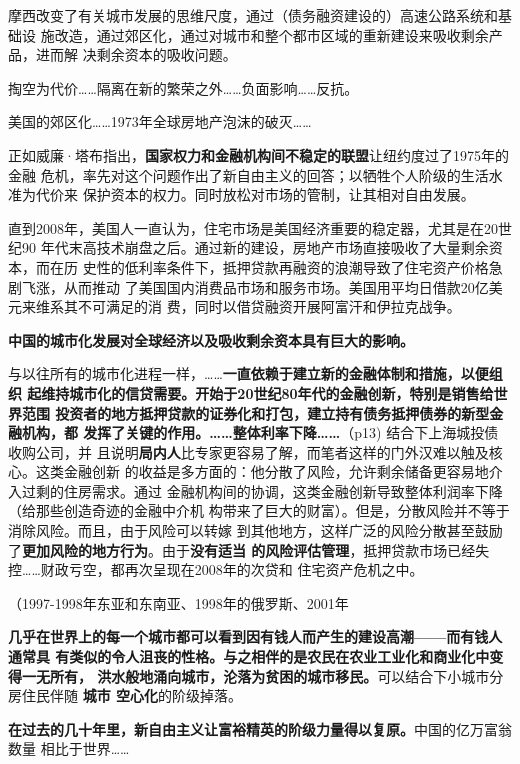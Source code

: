 摩西改变了有关城市发展的思维尺度，通过（债务融资建设的）高速公路系统和基础设
施改造，通过郊区化，通过对城市和整个都市区域的重新建设来吸收剩余产品，进而解
决剩余资本的吸收问题。

掏空为代价……隔离在新的繁荣之外……负面影响……反抗。

美国的郊区化……1973年全球房地产泡沫的破灭……

正如威廉·塔布指出，\textbf{国家权力和金融机构间不稳定的联盟}让纽约度过了1975年的金融
危机，率先对这个问题作出了新自由主义的回答；以牺牲个人阶级的生活水准为代价来
保护资本的权力。同时放松对市场的管制，让其相对自由发展。




直到2008年，美国人一直认为，住宅市场是美国经济重要的稳定器，尤其是在20世纪90
年代末高技术崩盘之后。通过新的建设，房地产市场直接吸收了大量剩余资本，而在历
史性的低利率条件下，抵押贷款再融资的浪潮导致了住宅资产价格急剧飞涨，从而推动
了美国国内消费品市场和服务市场。美国用平均日借款20亿美元来维系其不可满足的消
费，同时以借贷融资开展阿富汗和伊拉克战争。

\textbf{中国的城市化发展对全球经济以及吸收剩余资本具有巨大的影响。}

与以往所有的城市化进程一样，……\textbf{一直依赖于建立新的金融体制和措施，以便组织
  起维持城市化的信贷需要。开始于20世纪80年代的金融创新，特别是销售给世界范围
  投资者的地方抵押贷款的证券化和打包，建立持有债务抵押债券的新型金融机构，都
  发挥了关键的作用。……整体利率下降……}（p13) 结合下上海城投债收购公司，并
且说明\textbf{局内人}比专家更容易了解，而笔者这样的门外汉难以触及核心。这类金融创新
的收益是多方面的：他分散了风险，允许剩余储备更容易地介入过剩的住房需求。通过
金融机构间的协调，这类金融创新导致整体利润率下降（给那些创造奇迹的金融中介机
构带来了巨大的财富）。但是，分散风险并不等于消除风险。而且，由于风险可以转嫁
到其他地方，这样广泛的风险分散甚至鼓励了\textbf{更加风险的地方行为}。由于\textbf{没有适当
的风险评估管理}，抵押贷款市场已经失控……财政亏空，都再次呈现在2008年的次贷和
住宅资产危机之中。

（1997-1998年东亚和东南亚、1998年的俄罗斯、2001年

\textbf{几乎在世界上的每一个城市都可以看到因有钱人而产生的建设高潮——而有钱人通常具
有类似的令人沮丧的性格。与之相伴的是农民在农业工业化和商业化中变得一无所有，
洪水般地涌向城市，沦落为贫困的城市移民。}可以结合下小城市分房住民伴随 \textbf{城市
空心化}的阶级掉落。

\textbf{在过去的几十年里，新自由主义让富裕精英的阶级力量得以复原。}中国的亿万富翁数量
相比于世界……

